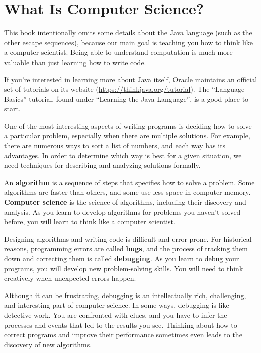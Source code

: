 \section{What Is Computer Science?}
\label{computer-programming_what-is-computer-science}

This book intentionally omits some details about the Java language (such as the other escape sequences), because our main goal is teaching you how to think like a computer scientist.
Being able to understand computation is much more valuable than just learning how to write code.

If you're interested in learning more about Java itself, Oracle maintains an official set of tutorials on its website (\url{https://thinkjava.org/tutorial}).
The ``Language Basics'' tutorial, found under ``Learning the Java Language'', is a good place to start.

One of the most interesting aspects of writing programs is deciding how to solve a particular problem, especially when there are multiple solutions.
For example, there are numerous ways to sort a list of numbers, and each way has its advantages.
In order to determine which way is best for a given situation, we need techniques for describing and analyzing solutions formally.


An {\bf algorithm} is a sequence of steps that specifies how to solve a problem.
Some algorithms are faster than others, and some use less space in computer memory.
{\bf Computer science} is the science of algorithms, including their discovery and analysis.
As you learn to develop algorithms for problems you haven't solved before, you will learn to think like a computer scientist.


Designing algorithms and writing code is difficult and error-prone.
For historical reasons, programming errors are called {\bf bugs}, and the process of tracking them down and correcting them is called {\bf debugging}.
As you learn to debug your programs, you will develop new problem-solving skills.
You will need to think creatively when unexpected errors happen.

Although it can be frustrating, debugging is an intellectually rich, challenging, and interesting part of computer science.
In some ways, debugging is like detective work.
You are confronted with clues, and you have to infer the processes and events that led to the results you see.
Thinking about how to correct programs and improve their performance sometimes even leads to the discovery of new algorithms.


